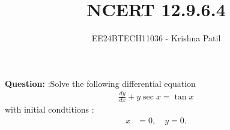 \documentclass[journal]{IEEEtran}
\begin{document}

\vspace{3cm}

\title{NCERT 12.9.6.4}
\author{EE24BTECH11036 - Krishna Patil}
{\let\newpage\relax\maketitle}

\renewcommand{\thefigure}{\theenumi}
\renewcommand{\thetable}{\theenumi}
\setlength{\intextsep}{10pt} %
\textbf{Question:} :Solve the following differential equation
\begin{align}
	\frac{dy}{dx} + y \sec x = \tan x
\end{align}
with initial condtitions :
\begin{align}
    x &= 0, \quad y = 0.
\end{align}
\solution
\end{document}
